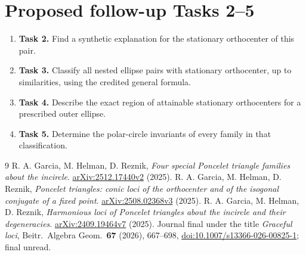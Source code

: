\documentclass[11pt]{article}
\begin{document}
\section*{Proposed follow-up Tasks 2--5}
\begin{enumerate}
\item \textbf{Task 2.} Find a synthetic explanation for the stationary
orthocenter of this pair.
\item \textbf{Task 3.} Classify all nested ellipse pairs with stationary
orthocenter, up to similarities, using the credited general formula.
\item \textbf{Task 4.} Describe the exact region of attainable stationary
orthocenters for a prescribed outer ellipse.
\item \textbf{Task 5.} Determine the polar-circle invariants of every
family in that classification.
\end{enumerate}

\begin{thebibliography}{9}
 R. A. Garcia, M. Helman, D. Reznik,
\emph{Four special Poncelet triangle families about the incircle}.
\href{https://arxiv.org/abs/2512.17440}{arXiv:2512.17440v2} (2025).
 R. A. Garcia, M. Helman, D. Reznik,
\emph{Poncelet triangles: conic loci of the orthocenter and of the
isogonal conjugate of a fixed point}.
\href{https://arxiv.org/abs/2508.02368}{arXiv:2508.02368v3} (2025).
 R. A. Garcia, M. Helman, D. Reznik,
\emph{Harmonious loci of Poncelet triangles about the incircle and their
degeneracies}. \href{https://arxiv.org/abs/2409.19464}{arXiv:2409.19464v7}
(2025). Journal final under the title \emph{Graceful loci},
Beitr.\ Algebra Geom.\ \textbf{67} (2026), 667--698,
\href{https://doi.org/10.1007/s13366-026-00825-1}{doi:10.1007/s13366-026-00825-1};
final unread.
\end{thebibliography}
\end{document}

